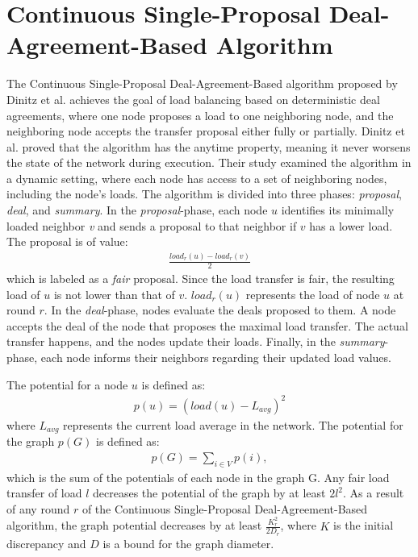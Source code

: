 \section{Continuous Single-Proposal Deal-Agreement-Based Algorithm}\label{sec:singleproposalDAB}
The Continuous Single-Proposal Deal-Agreement-Based algorithm proposed by Dinitz et al. \cite{Dinitz2023DAB} achieves the goal of load balancing based on deterministic deal agreements, where one node proposes a load to one neighboring node, and the neighboring node accepts the transfer proposal either fully or partially. Dinitz et al. proved that the algorithm has the anytime property, meaning it never worsens the state of the network during execution. Their study examined the algorithm in a dynamic setting, where each node has access to a set of neighboring nodes, including the node's loads. The algorithm is divided into three phases: \textit{proposal}, \textit{deal}, and \textit{summary}. In the \textit{proposal}-phase, each node $u$ identifies its minimally loaded neighbor \textit{v} and sends a proposal to that neighbor if $v$ has a lower load. The proposal is of value:
\begin{align}
    \frac{load_{r}(u)-load_{r}(v)}{2}    
\end{align}
which is labeled as a \textit{fair} proposal. Since the load transfer is fair, the resulting load of $u$ is not lower than that of $v$. $load_{r}(u)$ represents the load of node $u$ at round $r$. In the \textit{deal}-phase, nodes evaluate the deals proposed to them. A node accepts the deal of the node that proposes the maximal load transfer. The actual transfer happens, and the nodes update their loads. Finally, in the \textit{summary}-phase, each node informs their neighbors regarding their updated load values. \cite{Dinitz2023DAB}



The potential for a node $u$ is defined as:
\begin{align}
    p(u) = (load(u)-L_{avg})^{2}    
\end{align}
where $L_{avg}$ represents the current load average in the network. The potential for the graph $p(G)$ is defined as:
\begin{align}
    p(G)=\sum_{i\in V}{p(i)},   
\end{align}
which is the sum of the potentials of each node in the graph G. Any fair load transfer of load $l$ decreases the potential of the graph by at least $2l^{2}$. As a result of any round $r$ of the Continuous Single-Proposal Deal-Agreement-Based algorithm, the graph potential decreases by at least $\frac{K^{2}_r}{2D_r}$, where $K$ is the initial discrepancy and $D$ is a bound for the graph diameter. \cite{Dinitz2023DAB}

